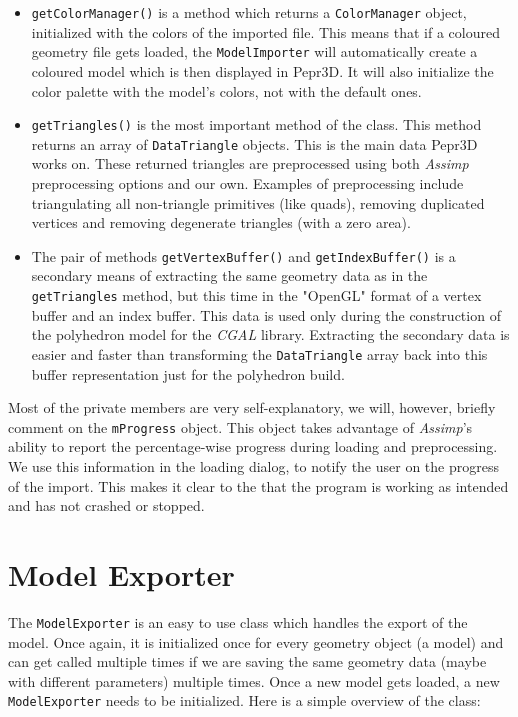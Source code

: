 \begin{itemize}
\item \texttt{getColorManager()} is a method which returns a \texttt{ColorManager} object, initialized with the colors of the imported file. This means that if a coloured geometry file gets loaded, the \texttt{ModelImporter} will automatically create a coloured model which is then displayed in Pepr3D. It will also initialize the color palette with the model's colors, not with the default ones.

\item \texttt{getTriangles()} is the most important method of the class. This method returns an array of \texttt{DataTriangle} objects. This is the main data Pepr3D works on. These returned triangles are preprocessed using both \textit{Assimp} preprocessing options and our own. Examples of preprocessing include triangulating all non-triangle primitives (like quads), removing duplicated vertices and removing degenerate triangles (with a zero area).

\item The pair of methods \texttt{getVertexBuffer()} and \texttt{getIndexBuffer()} is a secondary means of extracting the same geometry data as in the \texttt{getTriangles} method, but this time in the "OpenGL" format of a vertex buffer and an index buffer. This data is used only during the construction of the polyhedron model for the \textit{CGAL} library. Extracting the secondary data is easier and faster than transforming the \texttt{DataTriangle} array back into this buffer representation just for the polyhedron build.

\end{itemize}

Most of the private members are very self-explanatory, we will, however, briefly comment on the \texttt{mProgress} object. This object takes advantage of \textit{Assimp}'s ability to report the percentage-wise progress during loading and preprocessing. We use this information in the loading dialog, to notify the user on the progress of the import. This makes it clear to the that the program is working as intended and has not crashed or stopped.

\section{Model Exporter}

The \texttt{ModelExporter} is an easy to use class which handles the export of the model. Once again, it is initialized once for every geometry object (a model) and can get called multiple times if we are saving the same geometry data (maybe with different parameters) multiple times. Once a new model gets loaded, a new \texttt{ModelExporter} needs to be initialized. Here is a simple overview of the class:

